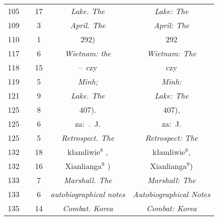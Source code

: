 \documentclass[a4paper,11pt]{article}
\begin{document}
\begin{center}
\begin{tabular}{|c|c|c|c|c|}
    105 & & 17 & \emph{Lake. The} & \emph{Lake: The} \\
    109 & &  3 & \emph{April. The} & \emph{April: The} \\
    110 & &  1 & 292) & 292 \\
    117 & &  6 & \emph{Wietnam: the} & \emph{Wietnam: The} \\
    118 & & 15 & --~czy & czy \\
    119 & &  5 & \emph{Minh;} & \emph{Minh:} \\
    121 & &  9 & \emph{Lake. The} & \emph{Lake: The} \\
    125 & &  8 & 407). & 407), \\
    125 & &  6 & za:~.~J. & za:~J. \\
    125 & &  5 & \emph{Retrospect. The} & \emph{Retrospect: The} \\
    132 & & 18 & kłamliwie$^{ 8 }$ , & kłamliwie$^{ 8 }$, \\
    132 & & 16 & Xianlianga$^{ 9 }$ ) & Xianlianga$^{ 9 }$) \\
    133 & &  7 & \emph{Marshall. The} & \emph{Marshall: The} \\
    133 & &  6 & \emph{autobiographical notes}
           & \emph{Autobiographical Notes} \\
    135 & & 14 & \emph{Combat. Korea} & \emph{Combat: Korea} \\
    \hline
  \end{tabular}



\end{center}
\end{document}
